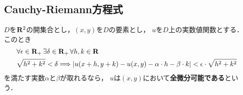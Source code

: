 \subsection{Cauchy-Riemann方程式}
	\begin{screen}
		\begin{dfn}[全微分可能]
			$D$を$\mathbf{R}^2$の開集合とし，$(x,y)$を$D$の要素とし，
			$u$を$D$上の実数値関数とする．このとき
			\begin{align}
				&\forall \epsilon \in \mathbf{R}_+\, \exists \delta \in \mathbf{R}_+\, \forall h,k \in \mathbf{R}\, \\
				&\sqrt{h^2 + k^2} < \delta \Longrightarrow
				\left|u(x+h,y+k) - u(x,y) - \alpha \cdot h - \beta \cdot k\right| 
				< \epsilon \cdot \sqrt{h^2 + k^2}
				\label{fom:def_totally_differentiability}
			\end{align}
			を満たす実数$\alpha$と$\beta$が取れるなら，
			$u$は$(x,y)$において{\bf 全微分可能である}という．
		\end{dfn}
	\end{screen}
	
